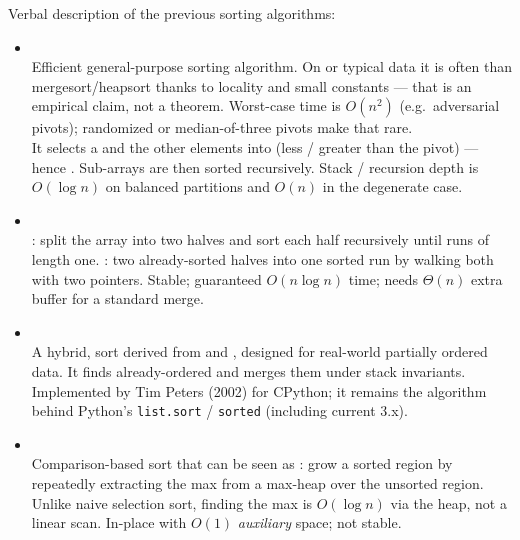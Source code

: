 Verbal description of the previous sorting algorithms:
\begin{itemize}

    \item \href{https://en.wikipedia.org/wiki/Quicksort}{} \\
    Efficient general-purpose sorting algorithm. On  or typical data it 
    is often  than mergesort/heapsort thanks to locality and 
    small constants --- that is an empirical claim, not a theorem. 
    Worst-case time is $O(n^2)$ (e.g.\ adversarial pivots); randomized or median-of-three 
    pivots make that rare. \\
    It selects a  and  the other elements into 
     (less / greater than the pivot) --- hence 
    . Sub-arrays are then sorted recursively. 
    Stack / recursion depth is $O(\log n)$ on balanced partitions and $O(n)$ in the 
    degenerate case.
    
    \item \href{https://en.wikipedia.org/wiki/Merge_sort}{} \\
    : split the array into two halves and sort each half recursively 
    until runs of length one. :  two already-sorted 
    halves into one sorted run by walking both with two pointers. 
    Stable; guaranteed $O(n\log n)$ time; needs $\Theta(n)$ extra buffer for a standard merge.
        
    \item \href{https://en.wikipedia.org/wiki/Timsort}{} \\
    A hybrid,  sort derived from  and 
    , designed for real-world partially ordered data. 
    It finds already-ordered  and merges them under stack invariants. 
    Implemented by Tim Peters (2002) for CPython; it remains the algorithm behind 
    Python's \texttt{list.sort} / \texttt{sorted} (including current 3.x).
    
    \item \href{https://en.wikipedia.org/wiki/Heapsort}{} \\
    Comparison-based sort that can be seen as : 
    grow a sorted region by repeatedly extracting the max from a max-heap over the 
    unsorted region. Unlike naive selection sort, finding the max is $O(\log n)$ via 
    the heap, not a linear scan. In-place with $O(1)$ \emph{auxiliary} space; not stable.
    

\end{itemize}
